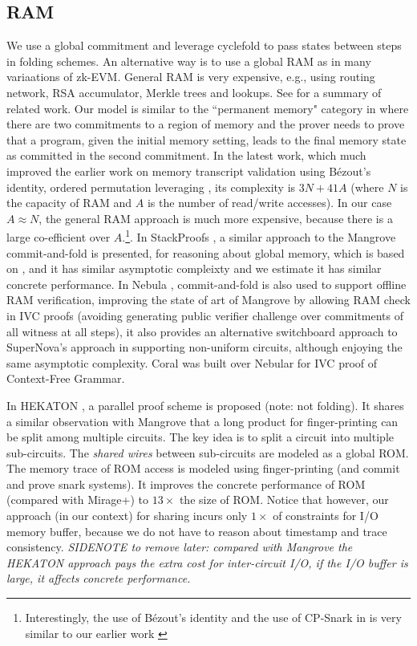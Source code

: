 \subsection{RAM}
	We use a global commitment and leverage cyclefold to pass
states between steps in folding schemes. An alternative way
is to use a global RAM as in many variaations of zk-EVM.
General RAM is very expensive, e.g., using
routing network, RSA accumulator, Merkle trees and lookups.
See \cite{AIPRam} for a summary of related work.
Our model is similar to the ``permanent memory" category
in \cite{AIPRam} where there are two commitments to a region of
memory and the prover needs to prove that a program, given the initial
memory setting, leads to the final memory state as committed in the
second commitment. In the latest work, which much improved
the earlier work on memory transcript validation using B\'{e}zout's identity,
ordered permutation leveraging \cite{Hab22}, its complexity 
is $3N + 41A$ (where $N$ is the capacity of RAM and $A$ is the
number of read/write accesses). In our case $A \approx N$,
the general RAM approach is much more expensive, because there
is a large co-efficient over $A$.\footnote{Interestingly, the 
use of B\'{e}zout's identity and the use of CP-Snark in \cite{AIPRam}
is very similar to our earlier work \cite{Zkreg}}.
In StackProofs \cite{StackProofs}, a similar approach to
the Mangrove commit-and-fold is presented, for reasoning about
global memory, which is based on \cite{Hab22}, and it has similar
asymptotic compleixty and we estimate it has similar concrete performance.
In Nebula \cite{Nebula}, commit-and-fold is also used to support
offline RAM verification, improving the state of art of Mangrove by
allowing RAM check in IVC proofs (avoiding generating public verifier
challenge over commitments of all witness at all steps), it also
provides an alternative switchboard approach to SuperNova's approach
in supporting non-uniform circuits, although enjoying the same
asymptotic complexity. Coral \cite{Coral} was built over
Nebular for IVC proof of Context-Free Grammar.

	In HEKATON \cite{HEKATON}, a parallel proof scheme is proposed (note:
not folding). It shares a similar observation with Mangrove that
a long product for finger-printing can be split among multiple circuits.
The key idea is to split a circuit into multiple sub-circuits.
The {\em shared wires} between sub-circuits are modeled as a global
ROM. The memory trace of ROM access is modeled using finger-printing (and
commit and prove snark systems). It improves the concrete
performance of ROM (compared with Mirage+) to $13\times$ the size
of ROM. Notice that however, our approach (in our context) for sharing
incurs only $1\times$ of constraints for I/O memory buffer, because
we do not have to reason about timestamp and trace consistency.
{\em SIDENOTE to remove later: compared with Mangrove the HEKATON
approach pays the extra cost for inter-circuit I/O, if the I/O buffer
is large, it affects concrete performance. }


